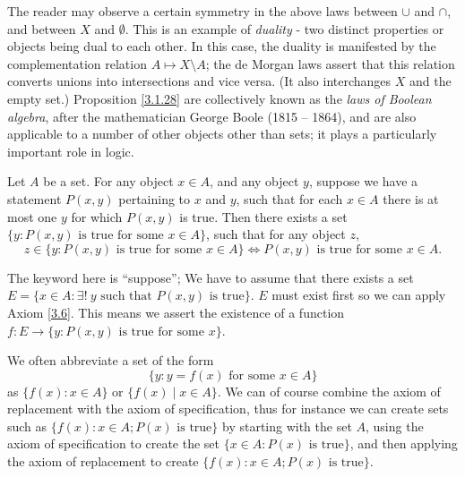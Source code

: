 \begin{remark}\label{3.1.30}
The reader may observe a certain symmetry in the above laws between \(\cup\) and \(\cap\), and between \(X\) and \(\emptyset\).
This is an example of \emph{duality} - two distinct properties or objects being dual to each other.
In this case, the duality is manifested by the complementation relation \(A \mapsto X \setminus A\);
the de Morgan laws assert that this relation converts unions into intersections and vice versa.
(It also interchanges \(X\) and the empty set.)
Proposition \ref{3.1.28} are collectively known as the \emph{laws of Boolean algebra}, after the mathematician George Boole (1815 -- 1864), and are also applicable to a number of other objects other than sets;
it plays a particularly important role in logic.
\end{remark}

\begin{axiom}[Replacement]\label{3.6}
Let \(A\) be a set.
For any object \(x \in A\), and any object \(y\), suppose we have a statement \(P(x, y)\) pertaining to \(x\) and \(y\), such that for each \(x \in A\) there is at most one \(y\) for which \(P(x, y)\) is true.
Then there exists a set \(\{y : P(x, y) \text{ is true for some } x \in A\}\), such that for any object \(z\),
\[
    z \in \{y: P(x, y) \text{ is true for some } x \in A\} \iff P(x, y) \text{ is true for some } x \in A.
\]
\end{axiom}

\begin{note}
The keyword here is ``suppose'';
We have to assume that there exists a set \(E = \{x \in A : \exists!\ y \text{ such that } P(x, y) \text{ is true}\}\).
\(E\) must exist first so we can apply Axiom \ref{3.6}.
This means we assert the existence of a function \(f : E \to \{y : P(x, y) \text{ is true for some } x\}\).
\end{note}

\begin{note}
We often abbreviate a set of the form
\[
    \{y : y = f(x) \text{ for some } x \in A\}
\]
as \(\{f(x) : x \in A\}\) or \(\{f(x) \mid x \in A\}\).
We can of course combine the axiom of replacement with the axiom of specification, thus for instance we can create sets such as \(\{f(x) : x \in A; P(x) \text{ is true}\}\) by starting with the set \(A\), using the axiom of specification to create the set \(\{x \in A : P(x) \text{ is true}\}\), and then applying the axiom of replacement to create \(\{f(x) : x \in A; P(x) \text{ is true}\}\).
\end{note}

